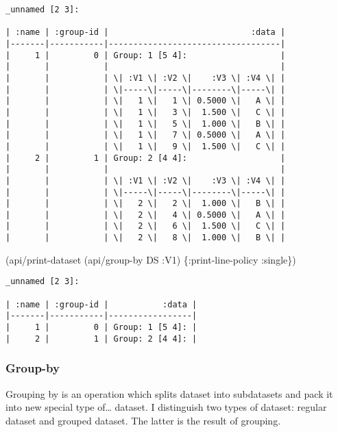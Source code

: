 \documentclass[]{article}
\newenvironment{Shaded}{\begin{snugshade}}{\end{snugshade}}
\newcommand{\AttributeTok}[1]{\textcolor[rgb]{0.77,0.63,0.00}{#1}}
\newcommand{\NormalTok}[1]{#1}
\begin{document}
\begin{verbatim}
_unnamed [2 3]:

| :name | :group-id |                             :data |
|-------|-----------|-----------------------------------|
|     1 |         0 | Group: 1 [5 4]:                   |
|       |           |                                   |
|       |           | \| :V1 \| :V2 \|    :V3 \| :V4 \| |
|       |           | \|-----\|-----\|--------\|-----\| |
|       |           | \|   1 \|   1 \| 0.5000 \|   A \| |
|       |           | \|   1 \|   3 \|  1.500 \|   C \| |
|       |           | \|   1 \|   5 \|  1.000 \|   B \| |
|       |           | \|   1 \|   7 \| 0.5000 \|   A \| |
|       |           | \|   1 \|   9 \|  1.500 \|   C \| |
|     2 |         1 | Group: 2 [4 4]:                   |
|       |           |                                   |
|       |           | \| :V1 \| :V2 \|    :V3 \| :V4 \| |
|       |           | \|-----\|-----\|--------\|-----\| |
|       |           | \|   2 \|   2 \|  1.000 \|   B \| |
|       |           | \|   2 \|   4 \| 0.5000 \|   A \| |
|       |           | \|   2 \|   6 \|  1.500 \|   C \| |
|       |           | \|   2 \|   8 \|  1.000 \|   B \| |
\end{verbatim}

\begin{Shaded}
\begin{Highlighting}[]
\NormalTok{(api/print-dataset (api/group-by DS }\AttributeTok{:V1}\NormalTok{) \{}\AttributeTok{:print-line-policy} \AttributeTok{:single}\NormalTok{\})}
\end{Highlighting}
\end{Shaded}

\begin{verbatim}
_unnamed [2 3]:

| :name | :group-id |           :data |
|-------|-----------|-----------------|
|     1 |         0 | Group: 1 [5 4]: |
|     2 |         1 | Group: 2 [4 4]: |
\end{verbatim}

\subsubsection{Group-by}\label{group-by}

Grouping by is an operation which splits dataset into subdatasets and
pack it into new special type of\ldots{} dataset. I distinguish two
types of dataset: regular dataset and grouped dataset. The latter is the
result of grouping.
\end{document}
